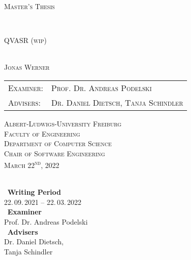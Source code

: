 \begin{titlepage}
	\begin{center}
		
		{\scshape\Large Master's Thesis\par}
		
		
		\HorizontalLine \\[0.4cm]
		{{\huge\scshape QVASR (wip) } \par}
		\HorizontalLine \\[1.5cm]
		
		
		{\Large \scshape Jonas Werner}\\[5cm]
		
		
		\begin{tabular}[scshape]{>{\normalsize}l >{\normalsize}l}
			\scshape Examiner: & \scshape Prof. Dr. Andreas Podelski\\[0.3cm]
			\scshape Advisers: & \scshape Dr. Daniel Dietsch, Tanja Schindler  \\[1.2cm]
		\end{tabular}
		\vfill  %
		
		\large { \scshape
			Albert-Ludwigs-University Freiburg\\
			Faculty of Engineering\\
			Department of Computer Science\\
			Chair of Software Engineering \\[1cm]
			
			March 22\textsuperscript{nd}, 2022\\
		}
	\end{center}
\end{titlepage}

\thispagestyle{empty}
\ \vfill \ \\  %
\
\textbf{Writing Period}            \smallskip{} \\
22.\,09.\,2021 -- 22.\,03.\,2022   \bigskip{} \\
\
\textbf{Examiner}                  \smallskip{} \\
Prof. Dr. Andreas Podelski                     \bigskip{} \\
\
\textbf{Advisers}                  \smallskip{} \\
Dr. Daniel Dietsch, \\ Tanja Schindler
\pagebreak